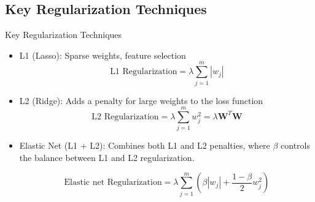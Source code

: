 \documentclass[serif, aspectratio=169]{beamer}
\begin{document}
\subsection{Key Regularization Techniques}
\begin{frame}{Key Regularization Techniques}
    \begin{itemize}[<+-| alert@+>] %

            \item L1 (Lasso): Sparse weights, feature selection
                \begin{equation}
                    \text{L1 Regularization} = \lambda \sum_{j=1}^{m} |w_j|
                \end{equation}

            \item L2 (Ridge): Adds a penalty for large weights to the loss function
                \begin{equation}
                    \text{L2 Regularization} = \lambda \sum_{j=1}^{m} w_j^2 =
                    \lambda \textbf{W}^T\textbf{W}
                \end{equation}

            \item Elastic Net (L1 + L2): Combines both L1 and L2 penalties, where $\beta$ controls the balance between L1 and L2 regularization.

                \begin{equation}
                    \text{Elastic net Regularization} =\lambda \sum_{j=1}^{m} (\beta|w_j| + \frac{1-\beta}{2} w_j^2)
                \end{equation}
            
    \end{itemize}
\end{frame}
\end{document}

